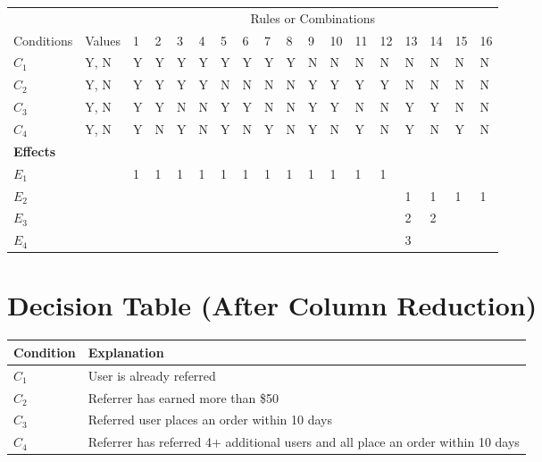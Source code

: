 \documentclass[10pt,letterpaper]{article}
\begin{document}
\begin{table}[h]
\begin{tabular}{@{}llllllllllllllllll@{}}
\toprule
                 &        & \multicolumn{16}{c}{Rules or Combinations}                           \\ \cmidrule(l){3-18} 
Conditions       & Values & 1 & 2 & 3 & 4 & 5 & 6 & 7 & 8 & 9 & 10 & 11 & 12 & 13 & 14 & 15 & 16 \\ \midrule
$C_1$            & Y, N   & Y & Y & Y & Y & Y & Y & Y & Y & N & N  & N  & N  & N  & N  & N  & N  \\
$C_2$            & Y, N   & Y & Y & Y & Y & N & N & N & N & Y & Y  & Y  & Y  & N  & N  & N  & N  \\
$C_3$            & Y, N   & Y & Y & N & N & Y & Y & N & N & Y & Y  & N  & N  & Y  & Y  & N  & N  \\
$C_4$            & Y, N   & Y & N & Y & N & Y & N & Y & N & Y & N  & Y  & N  & Y  & N  & Y  & N  \\
\textbf{Effects} &        &   &   &   &   &   &   &   &   &   &    &    &    &    &    &    &    \\
$E_1$            &        & 1 & 1 & 1 & 1 & 1 & 1 & 1 & 1 & 1 & 1  & 1  & 1  &    &    &    &    \\
$E_2$            &        &   &   &   &   &   &   &   &   &   &    &    &    & 1  & 1  & 1  & 1  \\
$E_3$            &        &   &   &   &   &   &   &   &   &   &    &    &    & 2  & 2  &    &    \\
$E_4$            &        &   &   &   &   &   &   &   &   &   &    &    &    & 3  &    &    &    \\ \bottomrule
\end{tabular}
\end{table}

\newpage
\section{Decision Table (After Column Reduction)}
\begin{table}[h]
\begin{tabular}{@{}ll@{}}
\toprule
Condition & Explanation                                                                     \\ \midrule
$C_1$     & User is already referred                                                        \\ \midrule
$C_2$     & Referrer has earned more than \$50                                              \\ \midrule
$C_3$     & Referred user places an order within 10 days                                    \\ \midrule
$C_4$     & Referrer has referred 4+ additional users and all place an order within 10 days \\ \bottomrule
\end{tabular}
\end{table}
\end{document}
